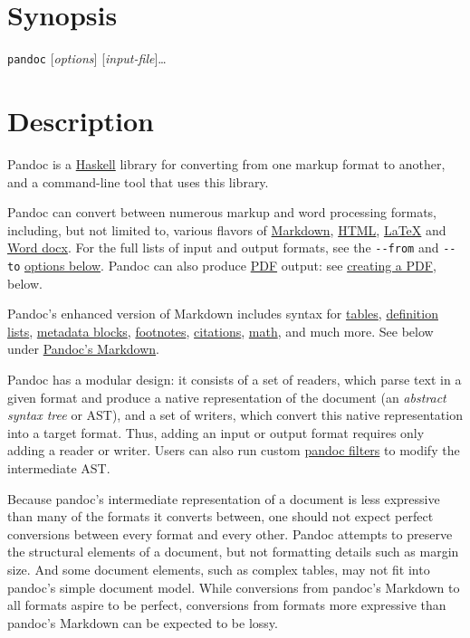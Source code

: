 \hypertarget{synopsis}{%
\section{Synopsis}\label{synopsis}}

\texttt{pandoc} {[}\emph{options}{]} {[}\emph{input-file}{]}\ldots{}

\hypertarget{description}{%
\section{Description}\label{description}}

Pandoc is a \href{https://www.haskell.org}{Haskell} library for
converting from one markup format to another, and a command-line tool
that uses this library.

Pandoc can convert between numerous markup and word processing formats,
including, but not limited to, various flavors of
\href{http://daringfireball.net/projects/markdown/}{Markdown},
\href{http://www.w3.org/html/}{HTML},
\href{http://latex-project.org}{LaTeX} and
\href{https://en.wikipedia.org/wiki/Office_Open_XML}{Word docx}. For the
full lists of input and output formats, see the \texttt{-\/-from} and
\texttt{-\/-to} \protect\hyperlink{general-options}{options below}.
Pandoc can also produce \href{https://www.adobe.com/pdf/}{PDF} output:
see \protect\hyperlink{creating-a-pdf}{creating a PDF}, below.

Pandoc's enhanced version of Markdown includes syntax for
\protect\hyperlink{tables}{tables},
\protect\hyperlink{definition-lists}{definition lists},
\protect\hyperlink{metadata-blocks}{metadata blocks},
\protect\hyperlink{footnotes}{footnotes},
\protect\hyperlink{citations}{citations},
\protect\hyperlink{math}{math}, and much more. See below under
\protect\hyperlink{pandocs-markdown}{Pandoc's Markdown}.

Pandoc has a modular design: it consists of a set of readers, which
parse text in a given format and produce a native representation of the
document (an \emph{abstract syntax tree} or AST), and a set of writers,
which convert this native representation into a target format. Thus,
adding an input or output format requires only adding a reader or
writer. Users can also run custom
\href{http://pandoc.org/filters.html}{pandoc filters} to modify the
intermediate AST.

Because pandoc's intermediate representation of a document is less
expressive than many of the formats it converts between, one should not
expect perfect conversions between every format and every other. Pandoc
attempts to preserve the structural elements of a document, but not
formatting details such as margin size. And some document elements, such
as complex tables, may not fit into pandoc's simple document model.
While conversions from pandoc's Markdown to all formats aspire to be
perfect, conversions from formats more expressive than pandoc's Markdown
can be expected to be lossy.

